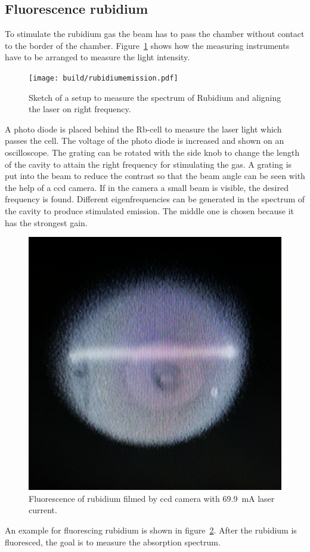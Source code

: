 \subsection{Fluorescence rubidium}%
\label{sub:anregen_rubidium}

To stimulate the rubidium gas the beam has to pass the chamber without contact
to the border of the chamber.
Figure~\ref{fig:hole_emission} shows how the measuring instruments have to be
arranged to measure the light intensity.
\begin{figure}[ht]
		\centering
		\texttt{[image: build/rubidiumemission.pdf]}
		\caption{Sketch of a setup to measure the spectrum of Rubidium and
		aligning the laser on right frequency.\cite{anleitung}}%
		\label{fig:hole_emission}
\end{figure}
A photo diode is placed behind the Rb-cell to measure the laser light which
passes the cell.
The voltage of the photo diode is increased and shown on an oscilloscope.
The grating can be rotated with the side knob to change the length of the
cavity to attain the right frequency for stimulating the gas.
A grating is put into the beam to reduce the contrast so that the beam angle
can be seen with the help of a ccd camera.
If in the camera a small beam is visible, the desired frequency is found.
Different eigenfrequencies can be generated in the spectrum of the
cavity to produce stimulated emission.
The middle one is chosen because it has the strongest gain.
\begin{figure}[ht]
		\centering
		\includegraphics[width=0.4\linewidth]{./content/pictures/fluorescence.jpg}
		\caption{Fluorescence of rubidium filmed by ccd camera with
				\SI{69.9}{\milli\ampere} laser current.}%
		\label{fig:ionized}
\end{figure}
An example for fluorescing rubidium is shown in figure~\ref{fig:ionized}.
After the rubidium is fluoresced, the goal is to measure the absorption spectrum.

